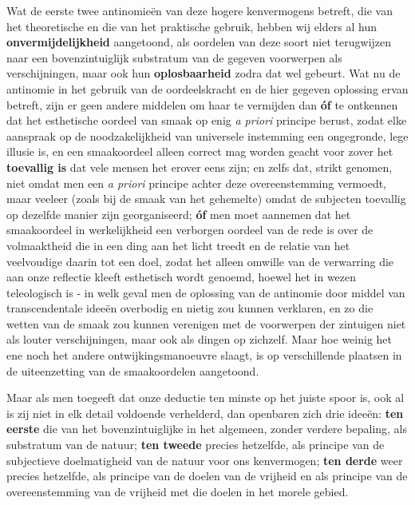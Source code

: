 Wat de eerste twee antinomieën van deze hogere kenvermogens betreft, die van het theoretische en die van het praktische gebruik, hebben wij elders al hun \textbf{onvermijdelijkheid} aangetoond, als oordelen van deze soort niet terugwijzen naar een bovenzintuiglijk substratum van de gegeven voorwerpen als verschijningen, maar ook hun \textbf{oplosbaarheid} zodra dat wel gebeurt. Wat nu de antinomie in het gebruik van de oordeelskracht en de hier gegeven oplossing ervan betreft, zijn er geen andere middelen om haar te vermijden dan \textbf{óf} te ontkennen dat het esthetische oordeel van smaak op enig \textit{a priori} principe berust, zodat elke aanspraak op de noodzakelijkheid van universele instemming een ongegronde, lege illusie is, en een smaakoordeel alleen correct mag worden geacht voor zover het \textbf{toevallig is} dat vele mensen het erover eens zijn; en zelfs dat, strikt genomen, niet omdat men een \textit{a priori} principe achter deze overeenstemming vermoedt, maar veeleer (zoals bij de smaak van het gehemelte) omdat de subjecten toevallig op dezelfde manier zijn georganiseerd; \textbf{óf} men moet aannemen dat het smaakoordeel in werkelijkheid een verborgen oordeel van de rede is over de volmaaktheid die in een ding aan het licht treedt en de relatie van het veelvoudige daarin tot een doel, zodat het alleen omwille van de verwarring die aan onze reflectie kleeft esthetisch wordt genoemd, hoewel het in wezen teleologisch is - in welk geval men de oplossing van de antinomie door middel van transcendentale ideeën overbodig en nietig zou kunnen verklaren, en zo die wetten van de smaak zou kunnen verenigen met de voorwerpen der zintuigen niet als louter verschijningen, maar ook als dingen op zichzelf. Maar hoe weinig het ene noch het andere ontwijkingsmanoeuvre slaagt, is op verschillende plaatsen in de uiteenzetting van de smaakoordelen aangetoond.

Maar als men toegeeft dat onze deductie ten minste op het juiste spoor is, ook al is zij niet in elk detail voldoende verhelderd, dan openbaren zich drie ideeën: \textbf{ten eerste} die van het bovenzintuiglijke in het algemeen, zonder verdere bepaling, als substratum van de natuur; \textbf{ten tweede} precies hetzelfde, als principe van de subjectieve doelmatigheid van de natuur voor ons kenvermogen; \textbf{ten derde} weer precies hetzelfde, als principe van de doelen van de vrijheid en als principe van de overeenstemming van de vrijheid met die doelen in het morele gebied.


